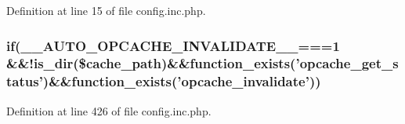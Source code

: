 Definition at line 15 of file config.\-inc.\-php.

\hypertarget{config_8inc_8php_a95d67dac5da3e46d0b07e9ad1647d08a}{
\subsubsection[{if}]{\setlength{\rightskip}{0pt plus 5cm}if(\-\_\-\-\_\-\-A\-U\-T\-O\-\_\-\-O\-P\-C\-A\-C\-H\-E\-\_\-\-I\-N\-V\-A\-L\-I\-D\-A\-T\-E\-\_\-\-\_\-===1 \&\&!is\-\_\-dir(\$cache\-\_\-path)\&\&function\-\_\-exists('opcache\-\_\-get\-\_\-status')\&\&function\-\_\-exists('opcache\-\_\-invalidate'))}}\label{config_8inc_8php_a95d67dac5da3e46d0b07e9ad1647d08a}


Definition at line 426 of file config.\-inc.\-php.

